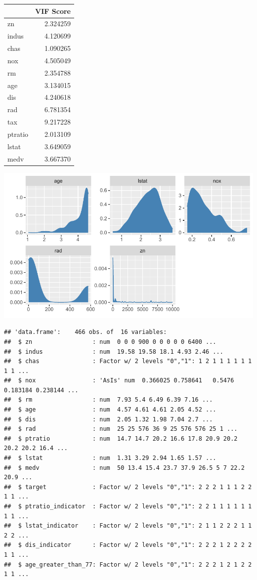 \documentclass[3p]{elsarticle} %
\begin{document}
\begin{table}[H]
\centering
\begin{tabular}{l|r}
\hline
  & VIF Score\\
\hline
zn & 2.324259\\
\hline
indus & 4.120699\\
\hline
chas & 1.090265\\
\hline
nox & 4.505049\\
\hline
rm & 2.354788\\
\hline
age & 3.134015\\
\hline
dis & 4.240618\\
\hline
rad & 6.781354\\
\hline
tax & 9.217228\\
\hline
ptratio & 2.013109\\
\hline
lstat & 3.649059\\
\hline
medv & 3.667370\\
\hline
\end{tabular}
\end{table}

\includegraphics{paper_files/figure-latex/unnamed-chunk-9-1.pdf}

\begin{verbatim}
## 'data.frame':    466 obs. of  16 variables:
##  $ zn                 : num  0 0 0 900 0 0 0 0 0 6400 ...
##  $ indus              : num  19.58 19.58 18.1 4.93 2.46 ...
##  $ chas               : Factor w/ 2 levels "0","1": 1 2 1 1 1 1 1 1 1 1 ...
##  $ nox                : 'AsIs' num  0.366025 0.758641   0.5476 0.183184 0.238144 ...
##  $ rm                 : num  7.93 5.4 6.49 6.39 7.16 ...
##  $ age                : num  4.57 4.61 4.61 2.05 4.52 ...
##  $ dis                : num  2.05 1.32 1.98 7.04 2.7 ...
##  $ rad                : num  25 25 576 36 9 25 576 576 25 1 ...
##  $ ptratio            : num  14.7 14.7 20.2 16.6 17.8 20.9 20.2 20.2 20.2 16.4 ...
##  $ lstat              : num  1.31 3.29 2.94 1.65 1.57 ...
##  $ medv               : num  50 13.4 15.4 23.7 37.9 26.5 5 7 22.2 20.9 ...
##  $ target             : Factor w/ 2 levels "0","1": 2 2 2 1 1 1 2 2 1 1 ...
##  $ ptratio_indicator  : Factor w/ 2 levels "0","1": 2 2 1 1 1 1 1 1 1 1 ...
##  $ lstat_indicator    : Factor w/ 2 levels "0","1": 2 1 1 2 2 2 1 1 2 2 ...
##  $ dis_indicator      : Factor w/ 2 levels "0","1": 2 2 2 1 2 2 2 2 1 1 ...
##  $ age_greater_than_77: Factor w/ 2 levels "0","1": 2 2 2 1 2 1 2 2 1 1 ...
\end{verbatim}
\end{document}
